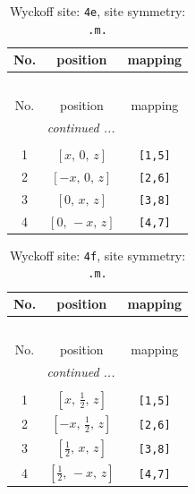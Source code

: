 \documentclass[fleqn,8pt]{jsarticle}
\begin{document}
\begin{longtable}{ccc}
\caption{Wyckoff site: {\tt 4e}, site symmetry: {\tt .m.}}
 \\
 \hline \hline
No. & position & mapping \\ \hline \endfirsthead

\multicolumn{2}{l}{\tablename\ \thetable{}} \\
 \hline \hline
No. & position & mapping \\ \hline \endhead

 \hline \hline
\multicolumn{2}{r}{\footnotesize\it continued ...} \\ \endfoot

 \hline \hline
\multicolumn{2}{r}{} \\ \endlastfoot

1 & $\left[ x,\, 0,\, z \right]$ & {\tt [1,5]} \\ \hline
2 & $\left[ - x,\, 0,\, z \right]$ & {\tt [2,6]} \\ \hline
3 & $\left[ 0,\, x,\, z \right]$ & {\tt [3,8]} \\ \hline
4 & $\left[ 0,\, - x,\, z \right]$ & {\tt [4,7]} \\
\end{longtable}
\renewcommand{\arraystretch}{1.2}
\begin{longtable}{ccc}
\caption{Wyckoff site: {\tt 4f}, site symmetry: {\tt .m.}}
 \\
 \hline \hline
No. & position & mapping \\ \hline \endfirsthead

\multicolumn{2}{l}{\tablename\ \thetable{}} \\
 \hline \hline
No. & position & mapping \\ \hline \endhead

 \hline \hline
\multicolumn{2}{r}{\footnotesize\it continued ...} \\ \endfoot

 \hline \hline
\multicolumn{2}{r}{} \\ \endlastfoot

1 & $\left[ x,\, \frac{1}{2},\, z \right]$ & {\tt [1,5]} \\ \hline
2 & $\left[ - x,\, \frac{1}{2},\, z \right]$ & {\tt [2,6]} \\ \hline
3 & $\left[ \frac{1}{2},\, x,\, z \right]$ & {\tt [3,8]} \\ \hline
4 & $\left[ \frac{1}{2},\, - x,\, z \right]$ & {\tt [4,7]} \\
\end{longtable}
\end{document}
